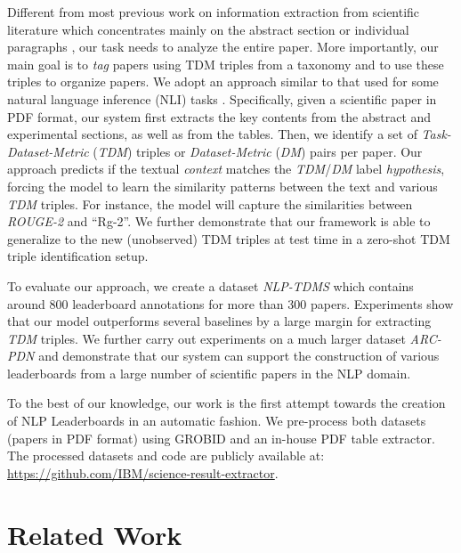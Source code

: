 \documentclass[11pt,a4paper]{article}
\begin{document}
Different from most previous work on information extraction from scientific literature which concentrates mainly on the abstract section or individual paragraphs \cite{semeval2017,semeval2018,Luan2018}, our task needs to analyze the entire paper. 
More importantly, our main goal is to \emph{tag} papers using TDM triples from a taxonomy and to use these triples to organize papers. 
We adopt an approach similar to that used for some natural language inference (NLI) tasks \cite{snli:emnlp2015,poliak:etal:18}.
Specifically, given a scientific paper in PDF format, our system first extracts the key contents from the abstract and experimental sections, as well as from the tables. 
Then, we identify a set of \emph{Task-Dataset-Metric} (\emph{TDM}) triples or \emph{Dataset-Metric} (\emph{DM}) pairs per paper.
Our approach predicts if the textual \emph{context} matches the \emph{TDM}/\emph{DM} label \emph{hypothesis}, forcing the model to learn the similarity patterns between the text and various \emph{TDM} triples. For instance, the model will capture the similarities between \emph{ROUGE-2} and ``Rg-2''. 
We further demonstrate that our framework is able to generalize to the new (unobserved)
TDM triples at test time in a zero-shot TDM triple identification setup.

To evaluate our approach, we create a dataset \emph{NLP-TDMS} which contains
around 800 leaderboard annotations for more than 300 papers. Experiments show that our model outperforms several baselines by a large margin for extracting \emph{TDM} triples. We further carry out experiments on a much larger dataset \emph{ARC-PDN} and demonstrate that our system can support the construction of various leaderboards from a large number of scientific papers in the NLP domain. 

To the best of our knowledge, our work is the first attempt towards the creation of NLP Leaderboards in an automatic fashion. We pre-process both datasets (papers in PDF format) using GROBID \cite{gorbid} and an in-house PDF table extractor.
The processed datasets and code are publicly available at: \url{https://github.com/IBM/science-result-extractor}.

\section{Related Work}
\label{sec:rel}
\end{document}
